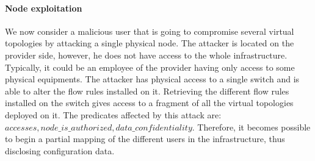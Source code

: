 \paragraph{Node exploitation} We now consider a malicious user that is going to compromise several virtual topologies by attacking a single physical node. 
The attacker is located on the provider side, however, he does not have access to the whole infrastructure.
Typically, it could be an employee of the provider having only access to some physical equipments.
The attacker has physical access to a single switch and is able to alter the flow rules installed on it.
Retrieving the different flow rules installed on the switch gives access to a fragment of all the virtual topologies deployed on it.
The predicates affected by this attack are: $accesses, node\_is\_authorized, data\_confidentiality$.
Therefore, it becomes possible to begin a partial mapping of the different users in the infrastructure, thus disclosing configuration data.

